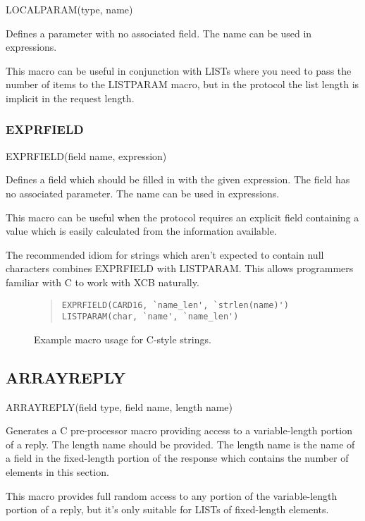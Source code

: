 \documentclass[english]{article}
\begin{document}
LOCALPARAM(type, name)

Defines a parameter with no associated field. The name can be used
in expressions.

This macro can be useful in conjunction with LISTs where you need to
pass the number of items to the LISTPARAM macro, but in the protocol
the list length is implicit in the request length.


\subsubsection{EXPRFIELD}

EXPRFIELD(field name, expression)

Defines a field which should be filled in with the given expression.
The field has no associated parameter. The name can be used in
expressions.

This macro can be useful when the protocol requires an explicit
field containing a value which is easily calculated from the
information available.

The recommended idiom for strings which aren't expected to contain
null characters combines EXPRFIELD with LISTPARAM. This allows
programmers familiar with C to work with XCB naturally.

\begin{figure}
\begin{quote}\begin{verbatim}
EXPRFIELD(CARD16, `name_len', `strlen(name)')
LISTPARAM(char, `name', `name_len')
\end{verbatim}\end{quote}
\caption{Example macro usage for C-style strings.}\label{fig-string}
\end{figure}


\subsection{ARRAYREPLY}

ARRAYREPLY(field type, field name, length name)

Generates a C pre-processor macro providing access to a variable-length
portion of a reply. The length name should be provided. The length name
is the name of a field in the fixed-length portion of the response which
contains the number of elements in this section.

This macro provides full random access to any portion of the
variable-length portion of a reply, but it's only suitable for LISTs of
fixed-length elements.
\end{document}
